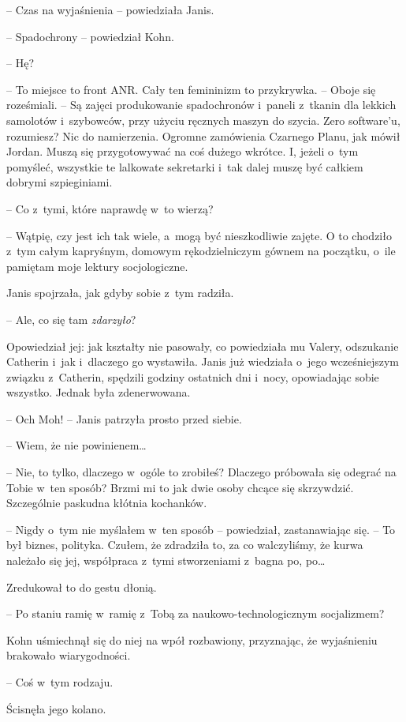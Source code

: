 \documentclass[oneside,polish,11pt,sfheadings]{mwbk}
\begin{document}
-- Czas na wyjaśnienia -- powiedziała Janis.

-- Spadochrony -- powiedział Kohn.

-- Hę?

-- To miejsce to front ANR. Cały ten femininizm to przykrywka. -- Oboje
się roześmiali. -- Są zajęci produkowanie spadochronów i~paneli z~tkanin
dla lekkich samolotów i~szybowców, przy użyciu ręcznych maszyn do
szycia. Zero software'u, rozumiesz? Nic do namierzenia. Ogromne zamówienia
Czarnego Planu, jak mówił Jordan. Muszą się przygotowywać na coś dużego
wkrótce. I, jeżeli o~tym pomyśleć, wszystkie te lalkowate sekretarki i~tak dalej muszę być całkiem dobrymi szpieginiami.

-- Co z~tymi, które naprawdę w~to wierzą?

-- Wątpię, czy jest ich tak wiele, a~mogą być nieszkodliwie zajęte. O to
chodziło z~tym całym kapryśnym, domowym rękodzielniczym gównem na
początku, o~ile pamiętam moje lektury socjologiczne.

Janis spojrzała, jak gdyby sobie z~tym radziła.

-- Ale, co się tam \emph{zdarzyło}?

Opowiedział jej: jak kształty nie pasowały, co powiedziała mu Valery,
odszukanie Catherin i~jak i~dlaczego go wystawiła. Janis już wiedziała o~jego wcześniejszym związku z~Catherin, spędzili godziny ostatnich dni i~nocy, opowiadając sobie wszystko. Jednak była zdenerwowana.

-- Och Moh! -- Janis patrzyła prosto przed siebie.

-- Wiem, że nie powinienem\ldots

-- Nie, to tylko, dlaczego w~ogóle to zrobiłeś? Dlaczego próbowała się
odegrać na Tobie w~ten sposób? Brzmi mi to jak dwie osoby chcące się
skrzywdzić. Szczególnie paskudna kłótnia kochanków.

-- Nigdy o~tym nie myślałem w~ten sposób -- powiedział, zastanawiając się.
-- To był biznes, polityka. Czułem, że zdradziła to, za co walczyliśmy,
że kurwa należało się jej, współpraca z~tymi stworzeniami z~bagna po,
po\ldots

Zredukował to do gestu dłonią.

-- Po staniu ramię w~ramię z~Tobą za naukowo-technologicznym socjalizmem?

Kohn uśmiechnął się do niej na wpół rozbawiony, przyznając, że
wyjaśnieniu brakowało wiarygodności. 

-- Coś w~tym rodzaju.

Ścisnęła jego kolano. 
\end{document}
